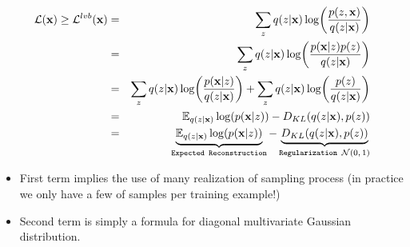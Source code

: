\documentclass[handout,xcolor=pdftex,dvipsnames,table,mathserif]{beamer}
\begin{document}
\begin{frame}
\begin{eqnarray*}
 \mathcal{L}(\mathbf{x}) \geq \mathcal{L}^{lvb}(\mathbf{x}) &=& \sum_{z} q(z|\mathbf{x}) \log(\frac{p(z,\mathbf{x}) }{q(z|\mathbf{x})}) \\
 &=& \sum_{z} q(z|\mathbf{x}) \log(\frac{p(\mathbf{x} | z) p(z)}{q(z|\mathbf{x})}) \\
 &=& \sum_{z} q(z|\mathbf{x}) \log(\frac{p(\mathbf{x} | z)}{q(z|\mathbf{x})}) +  \sum_{z} q(z|\mathbf{x}) \log(\frac{p(z)}{q(z|\mathbf{x})}) \\
 &=& \mathbb{E}_{q(z|\mathbf{x})} \log(p(\mathbf{x} | z)) -D_{KL}(q(z|\mathbf{x}),p(z))\\
  &=& \underbrace{\mathbb{E}_{q(z|\mathbf{x})} \log(p(\mathbf{x} | z))}_{\texttt{Expected Reconstruction}} - \underbrace{D_{KL}(q(z|\mathbf{x}),p(z))}_{\texttt{Regularization $\mathcal{N}(0,1)$}}\\
\end{eqnarray*}
\begin{itemize}
\item First term implies the use of many realization of sampling process (in practice we only have a few of samples per training example!)
\item Second term is simply a formula for diagonal multivariate Gaussian distribution.
\end{itemize}
\end{frame}
\end{document}
